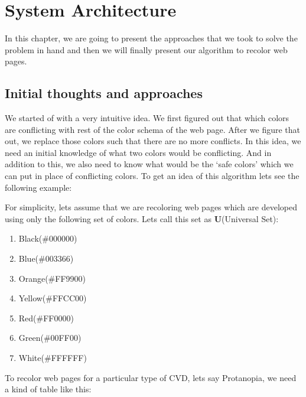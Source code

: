 \chapter{System Architecture}
\thispagestyle{plain}


\label{System Architecture}
In this chapter, we are going to present the approaches that we took to solve the problem in hand and then we will finally present our algorithm to recolor web pages.

\section{Initial thoughts and approaches}
\label{Initial approaches}
We started of with a very intuitive idea. We first figured out that which colors are conflicting with rest of the color schema of the web page. After we figure that out, we replace those colors such that there are no more conflicts. In this idea, we need an initial knowledge of what two colors would be conflicting. And in addition to this, we also need to know what would be the ‘safe colors’ which we can put in place of conflicting colors. To get an idea of this algorithm lets see the following example:

For simplicity, lets assume that we are recoloring web pages which are developed using only the following set of colors. Lets call this set as \textbf{U}(Universal Set):
\begin{enumerate}
    \item Black(\#000000)
    \item Blue(\#003366)
    \item Orange(\#FF9900)
    \item Yellow(\#FFCC00)
    \item Red(\#FF0000)
    \item Green(\#00FF00)
    \item White(\#FFFFFF)
\end{enumerate}

To recolor web pages for a particular type of CVD, lets say Protanopia, we need a kind of table like this:

